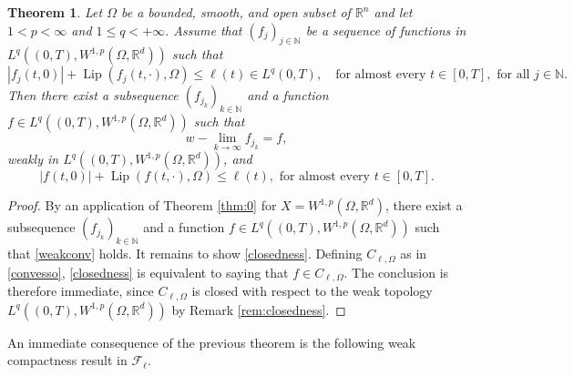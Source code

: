 \documentclass[11pt]{article}
\theoremstyle{plain}
\newtheorem{theorem}{Theorem}[section]
\theoremstyle{definition}
\theoremstyle{remark}
\numberwithin{equation}{section}
\newcommand{\Om}{\Omega}
\begin{document}
\begin{theorem}\label{thm:1}
Let $\Omega$ be a bounded, smooth, and open subset of $\mathbb R^n$ and let $1<p < \infty$ and $1\le q<+\infty$. 
Assume that  $(f_j)_{j \in \mathbb N}$ be a sequence of functions  in $L^q((0,T),W^{1,p}(\Omega, \mathbb R^d))$ such that
$$
|f_j(t,0) | + \operatorname{Lip}(f_j(t, \cdot),\Omega) \leq \ell(t) \in L^q(0,T),\quad \mbox{for almost every } t \in [0,T], \mbox{ for all } j \in \mathbb N.
$$
Then there exist a subsequence  $(f_{j_k})_{k \in \mathbb N}$ and a function $f \in L^q((0,T),W^{1,p}(\Omega, \mathbb R^d))$ such that
\begin{equation}\label{weakconv}
w-\lim_{k \to \infty} f_{j_k} = f,
\end{equation}
weakly in $L^q((0,T),W^{1,p}(\Omega, \mathbb R^d))$, and 
\begin{equation}\label{closedness}
|f(t,0) | + \operatorname{Lip}(f(t, \cdot),\Omega) \leq \ell(t), \mbox{ for almost every } t \in [0,T].
\end{equation}
\end{theorem}
\begin{proof}
By an application of Theorem \ref{thm:0} for $X =W^{1,p}(\Omega, \mathbb R^d)$, there exist a subsequence  $(f_{j_k})_{k \in \mathbb N}$ and a function $f \in L^q((0,T),W^{1,p}(\Omega, \mathbb R^d))$ such that
\eqref{weakconv} holds. It remains to show \eqref{closedness}. Defining $C_{\ell, \Om}$ as in \eqref{convesso},   \eqref{closedness} is equivalent to saying that $f \in C_{\ell, \Om}$. The conclusion is therefore immediate, since $C_{\ell, \Om}$ is closed with respect to the weak topology $L^q((0,T),W^{1,p}(\Omega, \mathbb R^d))$ by Remark \ref{rem:closedness}.
\end{proof}
An immediate consequence of the previous theorem is the following weak compactness result in $\mathcal F_\ell$.
\end{document}
